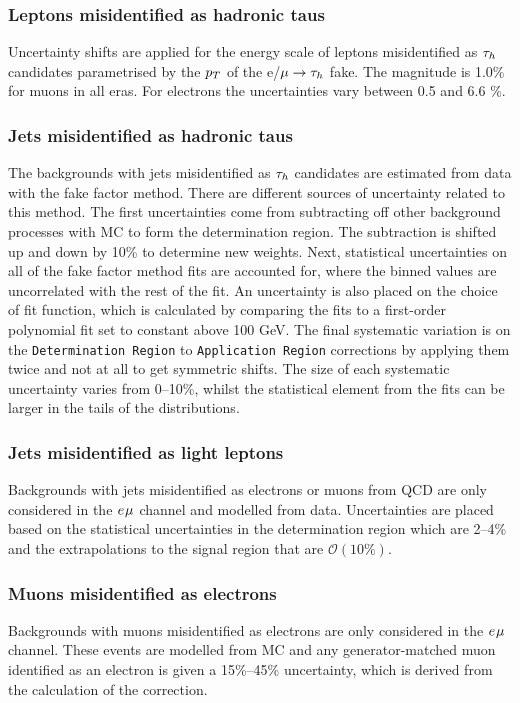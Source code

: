 \subsubsection{Leptons misidentified as hadronic taus}
Uncertainty shifts are applied for the energy scale of leptons misidentified as $\tau_{h}$ candidates parametrised by the $p_{T}$ of the e/$\mu\rightarrow\tau_{h}$ fake.
The magnitude is 1.0\% for muons in all eras. 
For electrons the uncertainties vary between 0.5 and 6.6 \%.

\subsubsection{Jets misidentified as hadronic taus}
The backgrounds with jets misidentified as $\tau_{h}$ candidates are estimated from data with the fake factor method. 
There are different sources of uncertainty related to this method.
The first uncertainties come from subtracting off other background processes with \ac{MC} to form the determination region. 
The subtraction is shifted up and down by 10\% to determine new weights.
Next, statistical uncertainties on all of the fake factor method fits are accounted for, where the binned values are uncorrelated with the rest of the fit.
An uncertainty is also placed on the choice of fit function, which is calculated by comparing the fits to a first-order polynomial fit set to constant above 100 GeV.
The final systematic variation is on the \texttt{Determination Region} to \texttt{Application Region} corrections by applying them twice and not at all to get symmetric shifts.
The size of each systematic uncertainty varies from 0--10\%, whilst the statistical element from the fits can be larger in the tails of the distributions.

\subsubsection{Jets misidentified as light leptons}
Backgrounds with jets misidentified as electrons or muons from \ac{QCD} are only considered in the $e_{}\mu_{}$ channel and modelled from data.
Uncertainties are placed based on the statistical uncertainties in the determination region which are 2--4\% and the extrapolations to the signal region that are $\mathcal{O}(10\%)$.

\subsubsection{Muons misidentified as electrons}
Backgrounds with muons misidentified as electrons are only considered in the $e_{}\mu_{}$ channel.
These events are modelled from \ac{MC} and any generator-matched muon identified as an electron is given a 15\%--45\% uncertainty, which is derived from the calculation of the correction.

